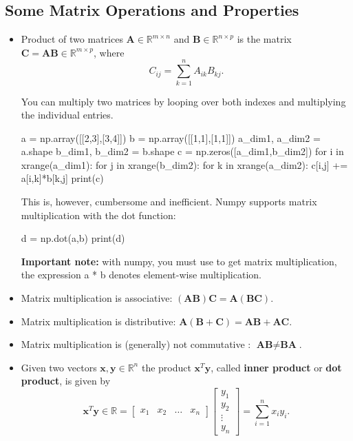 \subsection{Some Matrix Operations and Properties}
\begin{itemize}
\item Product of two matrices $\textbf{A} \in \mathbb{R}^{m\times n}$ and $\textbf{B} \in \mathbb{R}^{n\times p}$
is the matrix $\textbf{C}=\textbf{AB} \in \mathbb{R}^{m\times p}$, where 
\begin{equation*}
C_{ij}=\sum\limits_{k=1}^{n}A_{ik}B_{kj}.
\end{equation*}

\begin{exercise}
You can multiply two matrices by looping over both indexes and multiplying the individual entries.
\begin{python}
a = np.array([[2,3],[3,4]])
b = np.array([[1,1],[1,1]])
a_dim1, a_dim2 = a.shape
b_dim1, b_dim2 = b.shape
c = np.zeros([a_dim1,b_dim2])
for i in xrange(a_dim1):
   for j in xrange(b_dim2):
       for k in xrange(a_dim2):
          c[i,j] += a[i,k]*b[k,j]
print(c)
\end{python}

This is, however, cumbersome and inefficient. Numpy supports matrix multiplication with the dot function:

\begin{python}
d = np.dot(a,b)
print(d)
\end{python}

\textbf{Important note:} with numpy, you must use  to get matrix multiplication, the expression {a * b} denotes element-wise multiplication.
\end{exercise}

\item Matrix multiplication is associative: $(\textbf{AB})\textbf{C}= \textbf{A}(\textbf{BC})$.
\item Matrix multiplication is distributive: $\textbf{A}(\textbf{B}+\textbf{C})= \textbf{AB} + \textbf{AC}$.
\item Matrix multiplication is (generally) not commutative : $\textbf{AB} \neq \textbf{BA}$.
\item Given two vectors $\textbf{x},\textbf{y} \in \mathbb{R}^{n}$ the product $\textbf{x}^{T}\textbf{y}$, called {\bf inner product}
or {\bf dot product}, is given by
\begin{equation*}
\textbf{x}^{T}\textbf{y} \in \mathbb{R} = \left[\begin{array}{cccc}
x_{1}&x_{2}&\ldots&x_{n}\end{array}\right] \left[\begin{array}{c}
y_{1} \\
y_{2} \\
\vdots \\
y_{n}
\end{array}\right] = \sum\limits_{i=1}^{n}x_{i}y_{i}.
\end{equation*}


\end{itemize}
